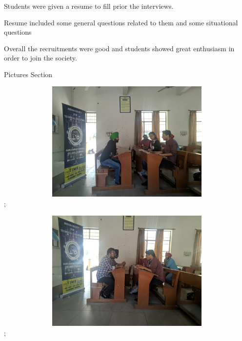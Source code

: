 \documentclass[12pt, a4 paper]{article}
\begin{document}
\begin{center}
\begin{Large}
\begin{multicols}{2}
\columnbreak
Students were given a resume to fill prior the interviews.
  
\end{multicols} 

\begin{multicols}{2}
 Resume included some general questions related to them and some situational questions

\columnbreak
  
\end{multicols} 

\begin{multicols}{2}

\columnbreak
Overall the recruitments were good and students showed great enthusiasm in order to join the society.
  
\end{multicols} 

\end{Large} 
\end{center}

\newpage 


\begin{center}
\Huge Pictures Section
\end{center}


\includegraphics[width=14cm,height=6cm]{image4.jpg};

\vline

\includegraphics[width=14cm,height=6cm]{image6.jpg};
\end{document}
